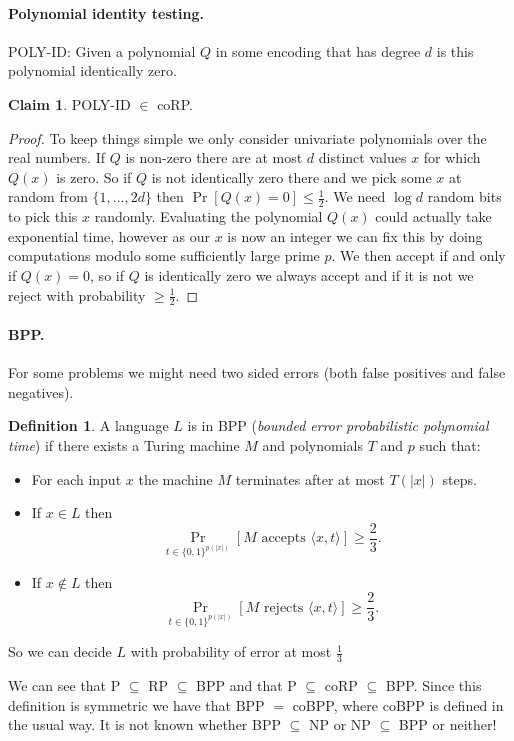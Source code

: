 \documentclass[11pt,a4paper]{article}
\theoremstyle{definition}
\newtheorem{claim}{Claim}
\newtheorem{defn}{Definition}
\begin{document}
\paragraph{Polynomial identity testing.}
POLY-ID: Given a polynomial $Q$ in some encoding that has degree $d$ is this polynomial identically zero.
\begin{claim}
POLY-ID $\in$ coRP.
\end{claim}
\begin{proof}
To keep things simple we only consider univariate polynomials over the real numbers.
If $Q$ is non-zero there are at most $d$ distinct values $x$ for which $Q(x)$ is zero.
So if $Q$ is not identically zero there and we pick some $x$ at random from $\{1,\ldots,2d\}$ then $\Pr[Q(x)= 0] \le \frac{1}{2}$.
We need $\log d$ random bits to pick this $x$ randomly.
Evaluating the polynomial $Q(x)$ could actually take exponential time, however as our $x$ is now an integer we can fix this by doing computations modulo some sufficiently large prime $p$.
We then accept if and only if $Q(x) = 0$, so if $Q$ is identically zero we always accept and if it is not we reject with probability $\ge\frac{1}{2}$.
\end{proof}

\paragraph{BPP.}
For some problems we might need two sided errors (both false positives and false negatives).
\begin{defn}
A language $L$ is in BPP (\emph{bounded error probabilistic polynomial time}) if there exists a Turing machine $M$ and polynomials $T$ and $p$ such that:
\begin{itemize}
\item
For each input $x$ the machine $M$ terminates after at most $T(|x|)$ steps.
\item
If $x\in L$ then \[\Pr_{t\in \{0,1\}^{p(|x|)}}[M \text{ accepts } \langle x, t\rangle] \ge \frac{2}{3}.\]
\item
If $x\not\in L$ then \[\Pr_{t\in \{0,1\}^{p(|x|)}}[M \text{ rejects } \langle x, t\rangle] \ge \frac{2}{3}.\]
\end{itemize}
So we can decide $L$ with probability of error at most $\frac{1}{3}$
\end{defn}
We can see that P $\subseteq$ RP $\subseteq$ BPP and that P $\subseteq$ coRP $\subseteq$ BPP.
Since this definition is symmetric we have that BPP $=$ coBPP, where coBPP is defined in the usual way.
It is not known whether BPP $\subseteq$ NP or NP $\subseteq$ BPP or neither!
\end{document}
